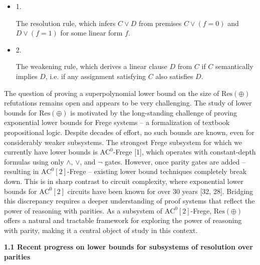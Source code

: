\documentclass[10pt,a4paper]{article}
\begin{document}
\begin{itemize}


\item 
1. 


The resolution rule, which infers $C\lor D$ from premises $C\lor(f=0)$ and $D\lor(f=1)$
for some linear form $f$.\par





\item 
2. 


The weakening rule, which derives a linear clause $D$ from $C$ if $C$ semantically implies $D$,
i.e. if any assignment satisfying $C$ also satisfies $D$.\par





\end{itemize}



The question of proving a superpolynomial lower bound on the size of $\mathrm{Res}(\oplus)$ refutations remains open
and appears to be very challenging.
The study of lower bounds for $\operatorname{\mathrm{Res}(\oplus)}$ is motivated by the long-standing challenge of proving exponential
lower bounds for Frege systems – a formalization of textbook propositional logic.
Despite decades of effort, no such bounds are known, even for considerably weaker subsystems.
The strongest Frege subsystem for which we currently have lower bounds is $\mathrm{AC}^{0}$-Frege [1],
which operates with constant-depth formulas using only $\land$, $\lor$, and $\lnot$ gates.
However, once parity gates are added – resulting in $\mathrm{AC}^{0}[2]$-Frege – existing lower bound
techniques completely break down.
This is in sharp contrast to circuit complexity, where exponential lower bounds for $\mathrm{AC}^{0}[2]$
circuits have been known for over 30 years [32, 28].
Bridging this discrepancy requires a
deeper understanding of proof systems that reflect the power of reasoning with parities.
As a subsystem of $\mathrm{AC}^{0}[2]$-Frege, $\operatorname{\mathrm{Res}(\oplus)}$ offers a natural and tractable framework for exploring
the power of reasoning with parity, making it a central object of study in this context.\par


\par\medskip\noindent\textbf{
1.1 Recent progress on lower bounds for subsystems of resolution over parities}\par
\end{document}
